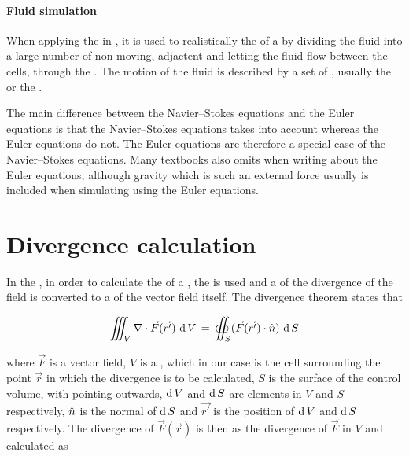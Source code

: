 \paragraph{Fluid simulation}

When applying the \FVM in \CFD, it is used to realistically \simulate the \flow of a \fluid by dividing the fluid into a large number of non-moving, adjactent \cells and letting the fluid flow between the cells, through the . The motion of the fluid is described by a set of \PDEs, usually the  or the .

The main difference between the Navier--Stokes equations and the Euler equations is that the Navier--Stokes equations takes  into account whe\-reas the Euler equations do not. The Euler equations are therefore a special case of the Navier--Stokes equations. Many textbooks also omits  when writing about the Euler equations, although gravity which is such an external force usually is included when simulating  using the Euler equations.

\section{Divergence calculation}

In the \PDEs, in order to calculate the \divergence of a , the  is used and a  of the divergence of the field is converted to a  of the vector field itself. The divergence theorem states that

\begin{equation} \label{eq:divergence_theorem}
\iiint_V\nabla\cdot\vec{F}(\vec{r'})\,\operatorname{d} V \,=\, \oiint_S(\vec{F}(\vec{r'})\cdot\hat{n})\,\operatorname{d} S
\end{equation}

where $\vec{F}$ is a vector field, $V$ is a , which in our case is the cell surrounding the point $\vec{r}$ in which the divergence is to be calculated, $S$ is the surface of the control volume, with  pointing outwards, $\operatorname{d} V$ and $\operatorname{d} S$ are \infinitesimal elements in $V$ and $S$ respectively, $\hat{n}$ is the normal of $\operatorname{d} S$ and $\vec{r'}$ is the position of $\operatorname{d} V$ and $\operatorname{d} S$ respectively. The divergence of $\vec{F}(\vec{r})$ is then \approximated as the \average divergence of $\vec{F}$ in $V$ and calculated as

